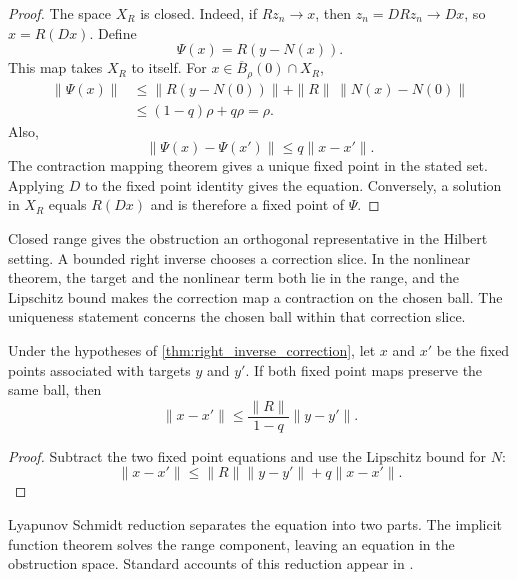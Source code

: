 \begin{proof}
The space $X_R$ is closed.  Indeed, if $Rz_n\to x$, then $z_n=DRz_n\to Dx$, so $x=R(Dx)$.  Define
\[
\Psi(x)=R(y-N(x)).
\]
This map takes $X_R$ to itself.  For $x\in\overline B_\rho(0)\cap X_R$,
\[
\begin{aligned}
\|\Psi(x)\|
&\le
\|R(y-N(0))\|
+
\|R\|\,\|N(x)-N(0)\|\\
&\le
(1-q)\rho+q\rho
=\rho.
\end{aligned}
\]
Also,
\[
\|\Psi(x)-\Psi(x')\|
\le q\|x-x'\|.
\]
The contraction mapping theorem gives a unique fixed point in the stated set.  Applying $D$ to the fixed point identity gives the equation.  Conversely, a solution in $X_R$ equals $R(Dx)$ and is therefore a fixed point of $\Psi$.
\end{proof}

\begin{keyidea}[title={The hypotheses behind correction}]
Closed range gives the obstruction an orthogonal representative in the Hilbert setting. A bounded right inverse chooses a correction slice. In the nonlinear theorem, the target and the nonlinear term both lie in the range, and the Lipschitz bound makes the correction map a contraction on the chosen ball. The uniqueness statement concerns the chosen ball within that correction slice.
\end{keyidea}

\begin{corollary}\label{cor:correction_stability}
Under the hypotheses of \cref{thm:right_inverse_correction}, let $x$ and $x'$ be the fixed points associated with targets $y$ and $y'$.  If both fixed point maps preserve the same ball, then
\[
\|x-x'\|
\le
\frac{\|R\|}{1-q}\|y-y'\|.
\]
\end{corollary}

\begin{proof}
Subtract the two fixed point equations and use the Lipschitz bound for $N$:
\[
\|x-x'\|
\le
\|R\|\|y-y'\|+q\|x-x'\|.
\]
\end{proof}

Lyapunov Schmidt reduction separates the equation into two parts. The implicit function theorem solves the range component, leaving an equation in the obstruction space. Standard accounts of this reduction appear in \cite{Kielhoefer2012,Zeidler1986}.

